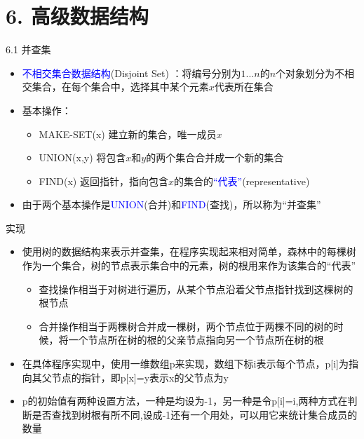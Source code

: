 


\frame{\titlepage}
\section{6. 高级数据结构}
\begin{frame}{6.1 并查集}
    \begin{itemize}
        \item \textcolor{blue}{不相交集合数据结构}(Disjoint Set) ：将编号分别为$1…n$的$n$个对象划分为不相交集合，在每个集合中，选择其中某个元素$x$代表所在集合
        \item 基本操作：
        \begin{itemize}
            \item MAKE-SET(x) 	建立新的集合，唯一成员$x$
            \item UNION(x,y) 	将包含$x$和$y$的两个集合合并成一个新的集合
            \item FIND(x) 		返回指针，指向包含$x$的集合的\textcolor{blue}{“代表”}(representative)
        \end{itemize}
        \item 由于两个基本操作是\textcolor{blue}{UNION}(合并)和\textcolor{blue}{FIND}(查找)，所以称为“并查集”
    \end{itemize}
\end{frame}
\begin{frame}{实现}
    \begin{itemize}
        \item 使用树的数据结构来表示并查集，在程序实现起来相对简单，森林中的每棵树作为一个集合，树的节点表示集合中的元素，树的根用来作为该集合的“代表”
        \begin{itemize}
            \item 查找操作相当于对树进行遍历，从某个节点沿着父节点指针找到这棵树的根节点
            \item 合并操作相当于两棵树合并成一棵树，两个节点位于两棵不同的树的时候，将一个节点所在树的根的父亲节点指向另一个节点所在树的根
        \end{itemize}
        \item 在具体程序实现中，使用一维数组p来实现，数组下标i表示每个节点，p[i]为指向其父节点的指针，即p[x]=y表示x的父节点为y
        \item p的初始值有两种设置方法，一种是均设为-1，另一种是令p[i]=i,两种方式在判断是否查找到树根有所不同,设成-1还有一个用处，可以用它来统计集合成员的数量
    \end{itemize}
\end{frame}
